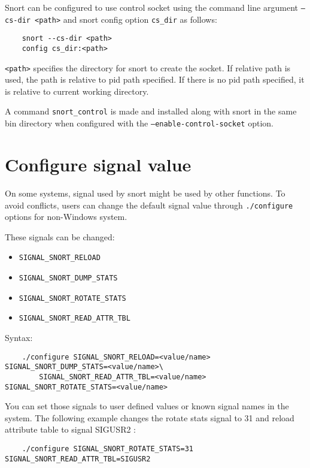 \documentclass[english]{report}
\begin{document}
Snort can be configured to use control socket using the command line argument \texttt{--cs-dir <path>}
 and snort config option \texttt{cs\_dir} as follows:

\begin{verbatim}
    snort --cs-dir <path>
    config cs_dir:<path>
\end{verbatim}

\texttt{<path>} specifies the directory for snort to create the socket. If relative path is used, 
the path is relative to pid path specified. If there is no pid path specified, it is relative to 
current working directory. 

A command \texttt{snort\_control} is made and installed along with snort in the same 
bin directory when configured with the \texttt{--enable-control-socket} option.

\section{Configure signal value}
\label{configure_signal}
On some systems, signal used by snort might be used by other functions. To avoid conflicts, 
users can change the default signal value through \texttt{./configure} options for non-Windows system.

These signals can be changed: 
\begin{itemize}
\item \texttt{SIGNAL\_SNORT\_RELOAD} 
\item \texttt{SIGNAL\_SNORT\_DUMP\_STATS}
\item \texttt{SIGNAL\_SNORT\_ROTATE\_STATS}
\item \texttt{SIGNAL\_SNORT\_READ\_ATTR\_TBL}
\end{itemize} 

Syntax:

\begin{verbatim}
    ./configure SIGNAL_SNORT_RELOAD=<value/name>  SIGNAL_SNORT_DUMP_STATS=<value/name>\
        SIGNAL_SNORT_READ_ATTR_TBL=<value/name> SIGNAL_SNORT_ROTATE_STATS=<value/name>
\end{verbatim}

You can set those signals to user defined values or known signal names in the system.
The following example changes the rotate stats signal to 31 and reload attribute table to
signal SIGUSR2 :

\begin{verbatim}
    ./configure SIGNAL_SNORT_ROTATE_STATS=31 SIGNAL_SNORT_READ_ATTR_TBL=SIGUSR2
\end{verbatim}
\end{document}
